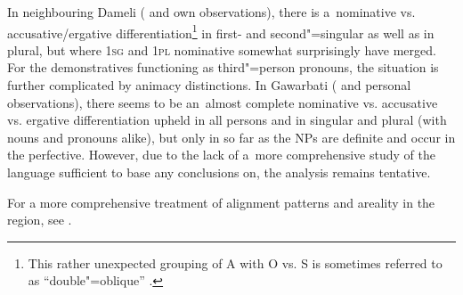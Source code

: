 In neighbouring Dameli (\citealt{morgenstierne1942} and own observations), there is a~nominative vs. accusative/ergative differentiation\footnote{This rather unexpected grouping of A with O vs. S is sometimes referred to as ``double"=oblique'' \citep{payne1980}.} in first- and second"=singular as well as in plural, but where \textsc{1sg} and \textsc{1pl} nominative somewhat surprisingly have merged. For the demonstratives functioning as third"=person pronouns, the situation is further complicated by animacy distinctions. In Gawarbati (\citealt{morgenstierne1950} and personal observations), there seems to be an~almost complete nominative vs. accusative vs. ergative differentiation upheld in all persons and in singular and plural (with nouns and pronouns alike), but only in so far as the NPs are definite and occur in the perfective. However, due to the lack of a~more comprehensive study of the language sufficient to base any conclusions on, the analysis remains tentative. 
 

For a more comprehensive treatment of alignment patterns and areality in the region, see \citet{liljegren2014}. 